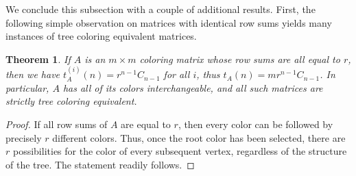 \documentclass[12pt]{amsart}
\newtheorem{theorem}{Theorem}
\begin{document}
We conclude this subsection with a couple of additional results. First, the following simple observation on matrices with identical row sums yields many instances of tree coloring equivalent matrices.

\begin{theorem}\label{prop:row-sums}
    If $A$ is an $m \times m$ coloring matrix whose row sums are all equal to $r$, then we have $t_A^{(i)}(n) = r^{n-1} C_{n-1}$ for all $i$, thus $t_A(n) = mr^{n-1}C_{n-1}$. 
    In particular, $A$ has all of its colors interchangeable, and all such matrices are strictly tree coloring equivalent.
\end{theorem}

\begin{proof}
If all row sums of $A$ are equal to $r$, then every color can be followed by precisely $r$ different colors. Thus, once the root color has been selected, there are $r$ possibilities for the color of every subsequent vertex, regardless of the structure of the tree. The statement readily follows.\end{proof}
\end{document}
